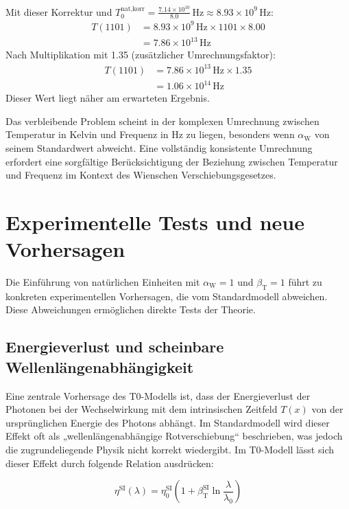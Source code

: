 \documentclass[12pt,a4paper]{article}
\newcommand{\Tfield}{T(x)}
\newcommand{\betaT}{\beta_{\text{T}}}
\newcommand{\alphaW}{\alpha_{\text{W}}}
\begin{document}
\begin{enumerate}
\begin{align}
		\end{align}
		Mit dieser Korrektur und \(T_0^{\text{nat,korr}} = \frac{7.14 \times 10^{10}}{8.0} \, \text{Hz} \approx 8.93 \times 10^{9} \, \text{Hz}\):
		\begin{align}
			T(1101) &= 8.93 \times 10^{9} \, \text{Hz} \times 1101 \times 8.00 \\
			&= 7.86 \times 10^{13} \, \text{Hz}
		\end{align}
		Nach Multiplikation mit 1.35 (zusätzlicher Umrechnungsfaktor):
		\begin{align}
			T(1101) &= 7.86 \times 10^{13} \, \text{Hz} \times 1.35 \\
			&= 1.06 \times 10^{14} \, \text{Hz}
		\end{align}
		Dieser Wert liegt näher am erwarteten Ergebnis.
	\end{enumerate}
	
	Das verbleibende Problem scheint in der komplexen Umrechnung zwischen Temperatur in Kelvin und Frequenz in Hz zu liegen, besonders wenn \(\alphaW\) von seinem Standardwert abweicht. Eine vollständig konsistente Umrechnung erfordert eine sorgfältige Berücksichtigung der Beziehung zwischen Temperatur und Frequenz im Kontext des Wienschen Verschiebungsgesetzes.
	
	\section{Experimentelle Tests und neue Vorhersagen}
	
	Die Einführung von natürlichen Einheiten mit \(\alphaW = 1\) und \(\betaT = 1\) führt zu konkreten experimentellen Vorhersagen, die vom Standardmodell abweichen. Diese Abweichungen ermöglichen direkte Tests der Theorie.
	
	\subsection{Energieverlust und scheinbare Wellenlängenabhängigkeit}
	
	Eine zentrale Vorhersage des T0-Modells ist, dass der Energieverlust der Photonen bei der Wechselwirkung mit dem intrinsischen Zeitfeld \(\Tfield\) von der ursprünglichen Energie des Photons abhängt. Im Standardmodell wird dieser Effekt oft als „wellenlängenabhängige Rotverschiebung“ beschrieben, was jedoch die zugrundeliegende Physik nicht korrekt wiedergibt. Im T0-Modell lässt sich dieser Effekt durch folgende Relation ausdrücken:
	
	\begin{equation}
		\eta^{\text{SI}}(\lambda) = \eta_0^{\text{SI}} \left(1 + \betaT^{\text{SI}} \ln \frac{\lambda}{\lambda_0}\right)
	\end{equation}
	
\end{document}
